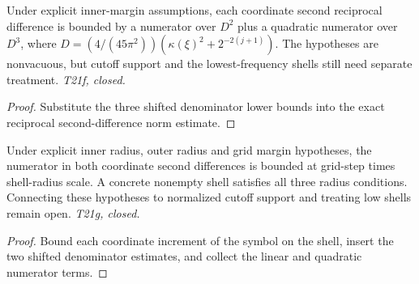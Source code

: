 \begin{lemma}
  \label{lem:symbol-reciprocal-annulus-bound}
  \leanok
  Under explicit inner-margin assumptions, each coordinate second reciprocal
  difference is bounded by a numerator over $D^2$ plus a quadratic numerator
  over $D^3$, where
  $D=(4/(45\pi^2))(\kappa(\xi)^2+2^{-2(j+1)})$.
  The hypotheses are nonvacuous, but cutoff support and the lowest-frequency
  shells still need separate treatment. \emph{T21f, closed.}
\end{lemma}
\begin{proof}\leanok
  Substitute the three shifted denominator lower bounds into the exact
  reciprocal second-difference norm estimate.
\end{proof}

\begin{lemma}
  \label{lem:symbol-annulus-numerator}
  \leanok
  Under explicit inner radius, outer radius and grid margin hypotheses, the
  numerator in both coordinate second differences is bounded at grid-step
  times shell-radius scale. A concrete nonempty shell satisfies all three
  radius conditions. Connecting these hypotheses to normalized cutoff
  support and treating low shells remain open. \emph{T21g, closed.}
\end{lemma}
\begin{proof}\leanok
  Bound each coordinate increment of the symbol on the shell, insert the
  two shifted denominator estimates, and collect the linear and quadratic
  numerator terms.
\end{proof}

